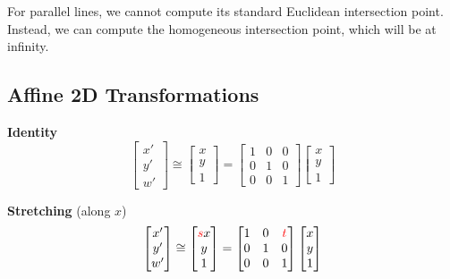 \begin{remark}
    For parallel lines, we cannot compute its standard Euclidean intersection point. Instead, we can compute the homogeneous intersection point, which will be at infinity.
\end{remark}

\subsection{Affine 2D Transformations}

\begin{listu}
    \item \textbf{Identity} \[
        \begin{bmatrix}
            x' \\ y' \\ w'
        \end{bmatrix} \cong \begin{bmatrix}
            x \\ y \\ 1
        \end{bmatrix} = \begin{bmatrix}
            1 & 0 & 0 \\
            0 & 1 & 0 \\
            0 & 0 & 1
        \end{bmatrix} \begin{bmatrix}
            x \\ y \\ 1
        \end{bmatrix}
    \]

    \item \textbf{Stretching} (along $x$) \[
        \begin{bmatrix}
            x' \\ y' \\ w'
        \end{bmatrix} \cong \begin{bmatrix}
            {\color{red} s} x \\ y \\ 1
        \end{bmatrix} = \begin{bmatrix}
            1 & 0 & {\color{red} t} \\
            0 & 1 & 0 \\
            0 & 0 & 1
        \end{bmatrix} \begin{bmatrix}
            x \\ y \\ 1
        \end{bmatrix}
    \]
    

\end{listu}
